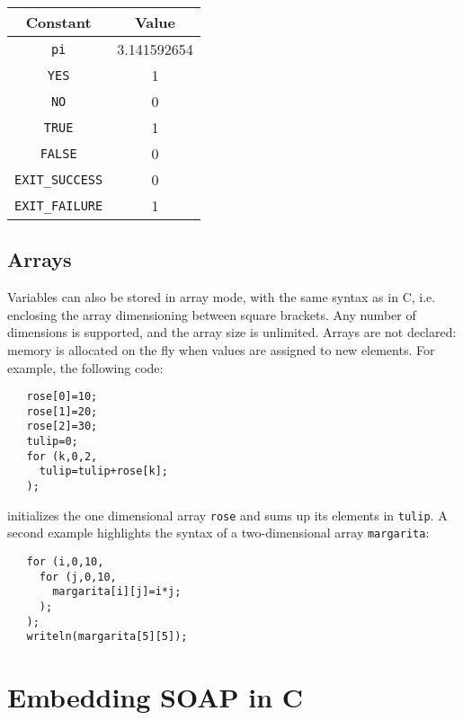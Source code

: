 \documentclass{warpdoc}
\newcommand{\tablespacing}{\vspace{-0.4cm}}
\renewcommand{\fontsizetable}{\footnotesize\scalefont{1.0}}
\begin{document}
\begin{table}[ht]
\fontsizetable
\vspace{0.3cm}
\begin{center}
  \begin{threeparttable}
    \begin{tabular}{cc}
      \toprule
        Constant & Value \\
       \midrule
        \verb|pi| & 3.141592654\\
        \verb|YES| & 1\\
        \verb|NO| & 0\\
        \verb|TRUE| & 1\\
        \verb|FALSE| & 0\\
        \verb|EXIT_SUCCESS| &0\\
        \verb|EXIT_FAILURE| &1   \\
      \bottomrule
    \end{tabular}
    \label{table:constants}
  \end{threeparttable}
\end{center}
\tablespacing
\end{table}
%




\subsection{Arrays}

Variables can also be stored in array mode, with the same syntax as in C,
i.e. enclosing the array dimensioning between square brackets. Any number of
dimensions is supported, and the array size is unlimited. Arrays
are not declared: memory is allocated on the fly when values are assigned
to new elements. For example, the following code:
%
\begin{verbatim}
   rose[0]=10;
   rose[1]=20;
   rose[2]=30;
   tulip=0;
   for (k,0,2,
     tulip=tulip+rose[k];
   );
\end{verbatim}
%
initializes the one dimensional array \verb|rose| and sums up its elements
in \verb|tulip|. A second example highlights the syntax of a two-dimensional
array \verb|margarita|:
%
\begin{verbatim}
   for (i,0,10,
     for (j,0,10,
       margarita[i][j]=i*j;
     );
   );
   writeln(margarita[5][5]);
\end{verbatim}
%



\section{Embedding SOAP in C}
\end{document}
